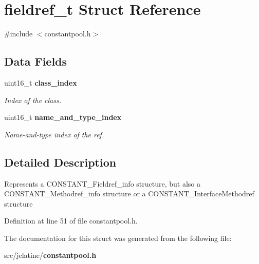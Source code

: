 \section{fieldref\_\-t Struct Reference}
\label{structfieldref__t}


{\ttfamily \#include $<$constantpool.h$>$}

\subsection*{Data Fields}
\begin{DoxyCompactItemize}
\item 
uint16\_\-t {\bf class\_\-index}\label{structfieldref__t_aeec5994f4b795cf8921379ffb4222d4a}

\begin{DoxyCompactList}\small\item\em Index of the class. \item\end{DoxyCompactList}\item 
uint16\_\-t {\bf name\_\-and\_\-type\_\-index}\label{structfieldref__t_aff865bdad19a6504a6965b24fdb5563b}

\begin{DoxyCompactList}\small\item\em Name-\/and-\/type index of the ref. \item\end{DoxyCompactList}\end{DoxyCompactItemize}


\subsection{Detailed Description}
Represents a CONSTANT\_\-Fieldref\_\-info structure, but also a CONSTANT\_\-Methodref\_\-info structure or a CONSTANT\_\-InterfaceMethodref structure 

Definition at line 51 of file constantpool.h.



The documentation for this struct was generated from the following file:\begin{DoxyCompactItemize}
\item 
src/jelatine/{\bf constantpool.h}\end{DoxyCompactItemize}
